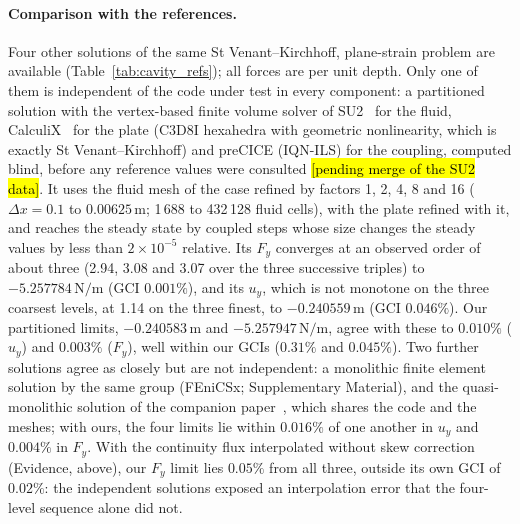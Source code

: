 \paragraph{Comparison with the references.}
Four other solutions of the same St Venant--Kirchhoff, plane-strain problem are available (Table~\ref{tab:cavity_refs}); all forces are per unit depth.
Only one of them is independent of the code under test in every component: a partitioned solution with the vertex-based finite volume solver of SU2~\citep{Economon2016,Economon2020} for the fluid, CalculiX~\citep{Dhondt2004} for the plate (C3D8I hexahedra with geometric nonlinearity, which is exactly St Venant--Kirchhoff) and preCICE (IQN-ILS) for the coupling, computed blind, before any reference values were consulted \hl{[pending merge of the SU2 data]}.
It uses the fluid mesh of the case refined by factors 1, 2, 4, 8 and 16 ($\Delta x = 0.1$ to $0.00625\,\mathrm{m}$; 1\,688 to 432\,128 fluid cells), with the plate refined with it, and reaches the steady state by coupled steps whose size changes the steady values by less than $2\times10^{-5}$ relative.
Its $F_y$ converges at an observed order of about three (2.94, 3.08 and 3.07 over the three successive triples) to $-5.257784\,\mathrm{N/m}$ (GCI $0.001\%$), and its $u_y$, which is not monotone on the three coarsest levels, at 1.14 on the three finest, to $-0.240559\,\mathrm{m}$ (GCI $0.046\%$).
Our partitioned limits, $-0.240583\,\mathrm{m}$ and $-5.257947\,\mathrm{N/m}$, agree with these to $0.010\%$ ($u_y$) and $0.003\%$ ($F_y$), well within our GCIs ($0.31\%$ and $0.045\%$).
Two further solutions agree as closely but are not independent: a monolithic finite element solution by the same group (FEniCSx; Supplementary Material), and the quasi-monolithic solution of the companion paper~\citep{CardiffBatistic2026QM}, which shares the code and the meshes; with ours, the four limits lie within $0.016\%$ of one another in $u_y$ and $0.004\%$ in $F_y$.
With the continuity flux interpolated without skew correction (Evidence, above), our $F_y$ limit lies $0.05\%$ from all three, outside its own GCI of $0.02\%$: the independent solutions exposed an interpolation error that the four-level sequence alone did not.

